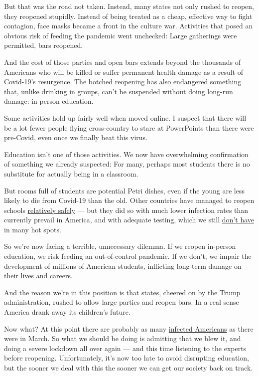 But that was the road not taken. Instead, many states not only rushed to
reopen, they reopened stupidly. Instead of being treated as a cheap,
effective way to fight contagion, face masks became a front in the
culture war. Activities that posed an obvious risk of feeding the
pandemic went unchecked: Large gatherings were permitted, bars reopened.

And the cost of those parties and open bars extends beyond the thousands
of Americans who will be killed or suffer permanent health damage as a
result of Covid-19's resurgence. The botched reopening has also
endangered something that, unlike drinking in groups, can't be suspended
without doing long-run damage: in-person education.

Some activities hold up fairly well when moved online. I suspect that
there will be a lot fewer people flying cross-country to stare at
PowerPoints than there were pre-Covid, even once we finally beat this
virus.

Education isn't one of those activities. We now have overwhelming
confirmation of something we already suspected: For many, perhaps most
students there is no substitute for actually being in a classroom.

But rooms full of students are potential Petri dishes, even if the young
are less likely to die from Covid-19 than the old. Other countries have
managed to reopen schools
\href{https://www.nytimes.com/2020/07/11/health/coronavirus-schools-reopen.html}{relatively
safely} --- but they did so with much lower infection rates than
currently prevail in America, and with adequate testing, which we still
\href{https://abcnews.go.com/Health/13-states-now-report-coronavirus-testing-issues-echo/story?id=71698974}{don't
have} in many hot spots.

So we're now facing a terrible, unnecessary dilemma. If we reopen
in-person education, we risk feeding an out-of-control pandemic. If we
don't, we impair the development of millions of American students,
inflicting long-term damage on their lives and careers.

And the reason we're in this position is that states, cheered on by the
Trump administration, rushed to allow large parties and reopen bars. In
a real sense America drank away its children's future.

Now what? At this point there are probably as many
\href{https://twitter.com/youyanggu/status/1282028088658976768}{infected
Americans} as there were in March. So what we should be doing is
admitting that we blew it, and doing a severe lockdown all over again
--- and this time listening to the experts before reopening.
Unfortunately, it's now too late to avoid disrupting education, but the
sooner we deal with this the sooner we can get our society back on
track.

